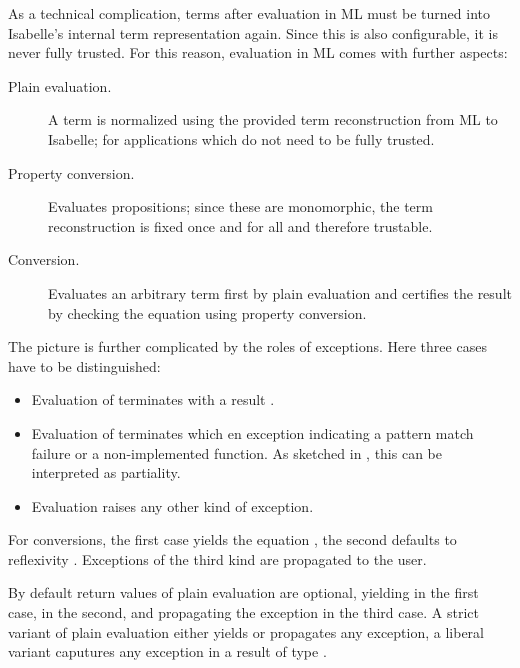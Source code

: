 \begin{isabellebody}
\begin{isamarkuptext}
  As a technical complication, terms after evaluation in ML must be
  turned into Isabelle's internal term representation again.  Since
  this is also configurable, it is never fully trusted.  For this
  reason, evaluation in ML comes with further aspects:

  \begin{description}

    \item[Plain evaluation.]  A term is normalized using the provided
      term reconstruction from ML to Isabelle; for applications which
      do not need to be fully trusted.

    \item[Property conversion.]  Evaluates propositions; since these
      are monomorphic, the term reconstruction is fixed once and for all
      and therefore trustable.

    \item[Conversion.]  Evaluates an arbitrary term  first
      by plain evaluation and certifies the result  by
      checking the equation  using property
      conversion.

  \end{description}

  \noindent The picture is further complicated by the roles of
  exceptions.  Here three cases have to be distinguished:

  \begin{itemize}

    \item Evaluation of  terminates with a result .

    \item Evaluation of  terminates which en exception
      indicating a pattern match failure or a non-implemented
      function.  As sketched in , this can be
      interpreted as partiality.
     
    \item Evaluation raises any other kind of exception.
     
  \end{itemize}

  \noindent For conversions, the first case yields the equation , the second defaults to reflexivity .
  Exceptions of the third kind are propagated to the user.

  By default return values of plain evaluation are optional, yielding
   in the first case,  in the
  second, and propagating the exception in the third case.  A strict
  variant of plain evaluation either yields  or propagates
  any exception, a liberal variant caputures any exception in a result
  of type .
  

\end{isamarkuptext}
\end{isabellebody}
